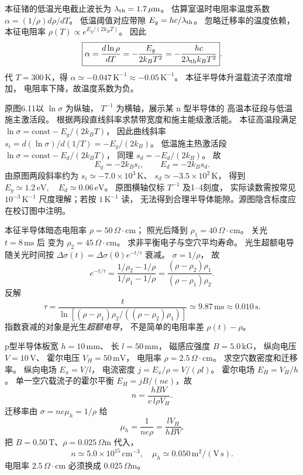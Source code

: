 本征锗的低温光电截止波长为
$\lambda_{\rm th}=1.7\,\mu\mathrm m$。
估算室温时电阻率温度系数
$\alpha=(1/\rho)d\rho/dT$。
\exsolution
低温阈值对应带隙
$E_g=hc/\lambda_{\rm th}$。
忽略迁移率的温度依赖，
本征电阻率
$\rho(T)\propto e^{E_g/(2k_BT)}$。
因此
\[
 \boxed{\alpha=\frac{d\ln\rho}{dT}
 =-\frac{E_g}{2k_BT^2}
 =-\frac{hc}{2\lambda_{\rm th}k_BT^2}}.
\]
代 $T=300\,\mathrm K$，得
$\boxed{\alpha\simeq-0.047\,\mathrm{K^{-1}}
 \approx-0.05\,\mathrm{K^{-1}}}$。
\excheck 本征半导体升温载流子浓度增加，
电阻率下降，故温度系数为负。

原图6.11以 $\ln\sigma$ 为纵轴，
$T^{-1}$ 为横轴，展示某 n 型半导体的
高温本征段与低温施主激活段。
根据两段直线斜率求禁带宽度和施主能级激活能。
\exsolution
本征高温段满足
$\ln\sigma=\mathrm{const}-E_g/(2k_BT)$，
因此曲线斜率
$s_i=d(\ln\sigma)/d(1/T)=-E_g/(2k_B)$。
低温施主热激活段
$\ln\sigma=\mathrm{const}-E_d/(2k_BT)$，
同理 $s_d=-E_d/(2k_B)$。
故
\[
 \boxed{E_g=-2k_Bs_i},\qquad
 \boxed{E_d=-2k_Bs_d}.
\]
由原图两段斜率约为
$s_i\simeq-7.0\times10^3\,\mathrm K$、
$s_d\simeq-3.5\times10^2\,\mathrm K$，
得到
$\boxed{E_g\simeq1.2\,\mathrm{eV},\quad
 E_d\simeq0.06\,\mathrm{eV}}$。
\excheck 原图横轴仅标 $T^{-1}$ 及1--4刻度，
实际读数需按常见 $10^{-3}\,\mathrm{K^{-1}}$
尺度理解；若按 $1\,\mathrm{K^{-1}}$ 读，
无法得到合理半导体能隙。源图隐含标度应在校订图中注明。

本征半导体暗态电阻率
$\rho=50\,\Omega\cdot\mathrm{cm}$；
照光后降到
$\rho_1=40\,\Omega\cdot\mathrm{cm}$。
关光 $t=8\,\mathrm{ms}$ 后
变为 $\rho_2=45\,\Omega\cdot\mathrm{cm}$。
求非平衡电子与空穴平均寿命。
\exsolution
光生超额电导随关光时间按
$\Delta\sigma(t)=\Delta\sigma(0)e^{-t/\tau}$ 衰减。
$\sigma=1/\rho$，
故
\[
 e^{-t/\tau}=
 \frac{1/\rho_2-1/\rho}{1/\rho_1-1/\rho}
 =\frac{(\rho-\rho_2)\rho_1}
 {(\rho-\rho_1)\rho_2}.
\]
反解
\[
 \boxed{\tau=\frac t{
 \ln[(\rho-\rho_1)\rho_2/((\rho-\rho_2)\rho_1)]}
 \simeq9.87\,\mathrm{ms}\approx0.010\,\mathrm s}.
\]
\excheck 指数衰减的对象是光生\emph{超额电导}，
不是简单的电阻率差 $\rho(t)-\rho$。

p型半导体板宽 $h=10\,\mathrm{mm}$、
长 $l=50\,\mathrm{mm}$，
磁感应强度 $B=5.0\,\mathrm{kG}$，
纵向电压 $V=10\,\mathrm V$、
霍尔电压 $V_H=50\,\mathrm{mV}$，
电阻率 $\rho=2.5\,\Omega\cdot\mathrm{cm}$。
求空穴数密度和迁移率。
\exsolution
纵向电场 $E_x=V/l$，
电流密度 $j=E_x/\rho=V/(\rho l)$。
霍尔电场 $E_H=V_H/h$。
单一空穴载流子的霍尔平衡
$E_H=jB/(ne)$，故
\[
 \boxed{n=\frac{hBV}{e\,l\rho V_H}}.
\]
迁移率由 $\sigma=ne\mu_h=1/\rho$ 给
\[
 \boxed{\mu_h=\frac1{ne\rho}
 =\frac{lV_H}{hBV}}.
\]
把 $B=0.50\,\mathrm T$、$\rho=0.025\,\Omega\mathrm m$
代入，
\[
 \boxed{n\simeq5.0\times10^{15}\,\mathrm{cm^{-3}},
 \quad\mu_h\simeq0.050\,\mathrm{m^2/(V\,s)}}.
\]
\excheck 电阻率 $2.5\,\Omega\cdot\mathrm{cm}$
必须换成 $0.025\,\Omega\mathrm m$。


